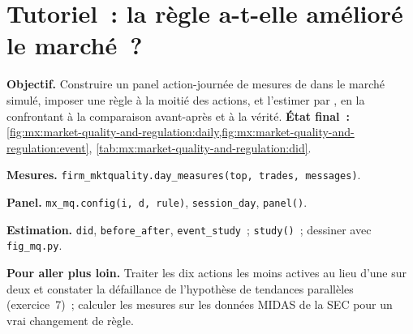 \begin{omfigure}

\label{fig:mx:market-quality-and-regulation:event}
\end{omfigure}

\section{Tutoriel~: la règle a-t-elle amélioré le marché~?}\label{tut:mx:market-quality-and-regulation:tut}

\begin{tutorial}
\textbf{Objectif.} Construire un panel action-journée de mesures de  dans le marché simulé, imposer une règle à la moitié des actions, et l'estimer par
, en la confrontant à la comparaison avant-après et à la vérité.
\textbf{État final~:} \cref{fig:mx:market-quality-and-regulation:daily,fig:mx:market-quality-and-regulation:event},
\cref{tab:mx:market-quality-and-regulation:did}.
\begin{tutsteps}
\item \textbf{Mesures.} \texttt{firm\_mktquality.day\_measures(top, trades, messages)}.
\item \textbf{Panel.} \texttt{mx\_mq.config(i, d, rule)}, \texttt{session\_day}, \texttt{panel()}.
\item \textbf{Estimation.} \texttt{did}, \texttt{before\_after}, \texttt{event\_study}~; \texttt{study()}~; dessiner avec \texttt{fig\_mq.py}.
\end{tutsteps}
\textbf{Pour aller plus loin.} Traiter les dix actions les moins actives au lieu d'une sur deux et constater la défaillance de l'hypothèse de tendances parallèles
(exercice~7)~; calculer les mesures sur les données MIDAS de la SEC pour un vrai changement de règle.
\end{tutorial}


